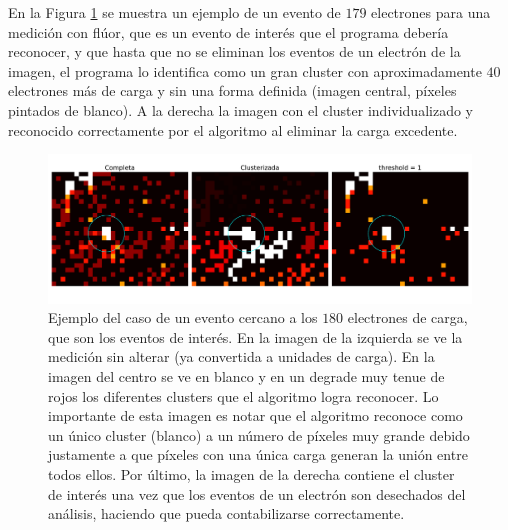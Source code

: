 En la Figura \ref{fig:ClusterPegoteado} se muestra un ejemplo de un evento de $179$ electrones para una medición con flúor, que es un evento de interés que el programa debería reconocer, y que hasta que no se eliminan los eventos de un electrón de la imagen, el programa lo identifica como un gran cluster con aproximadamente $40$ electrones más de carga y sin una forma definida (imagen central, píxeles pintados de blanco). A la derecha la imagen con el cluster individualizado y reconocido correctamente por el algoritmo al eliminar la carga excedente.
\begin{figure}[H]
    \centering
    \includegraphics[scale=0.4]{Figs/despegoteo_clusters.pdf}
    \caption{Ejemplo del caso de un evento cercano a los $180$ electrones de carga, que son los eventos de interés. En la imagen de la izquierda se ve la medición sin alterar (ya convertida a unidades de carga). En la imagen del centro se ve en blanco y en un degrade muy tenue de rojos los diferentes clusters que el algoritmo logra reconocer. Lo importante de esta imagen es notar que el algoritmo reconoce como un único cluster (blanco) a un número de píxeles muy grande debido justamente a que píxeles con una única carga generan la unión entre todos ellos. Por último, la imagen de la derecha contiene el cluster de interés una vez que los eventos de un electrón son desechados del análisis, haciendo que pueda contabilizarse correctamente.}
    \label{fig:ClusterPegoteado}
\end{figure}

